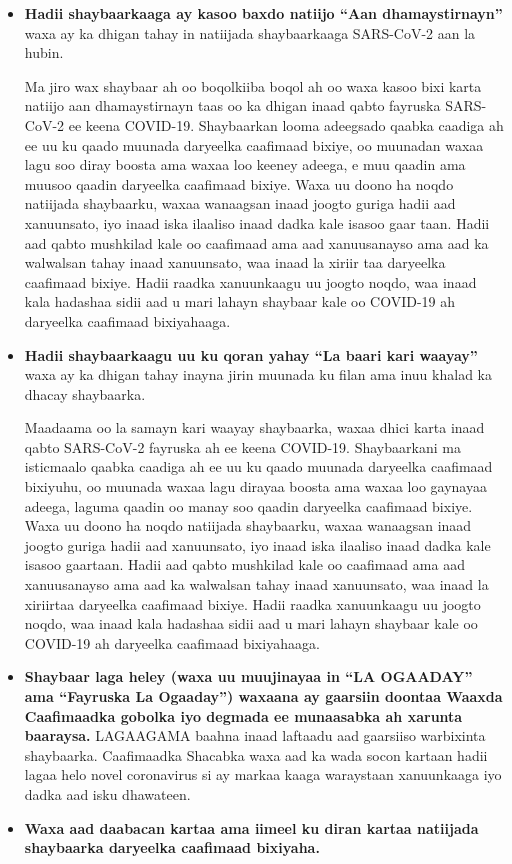 \documentclass[10pt]{article}
\begin{document}
\begin{itemize}
\item

  \textbf{Hadii shaybaarkaaga ay kasoo baxdo natiijo ``Aan dhamaystirnayn''}
  waxa ay ka dhigan tahay in natiijada shaybaarkaaga SARS-CoV-2 aan la hubin.

  Ma jiro wax shaybaar ah oo boqolkiiba boqol ah oo waxa kasoo bixi karta
  natiijo aan dhamaystirnayn taas oo ka dhigan inaad qabto fayruska SARS-CoV-2
  ee keena COVID-19.  Shaybaarkan looma adeegsado qaabka caadiga ah ee uu ku
  qaado muunada daryeelka caafimaad bixiye, oo muunadan waxaa lagu soo diray
  boosta ama waxaa loo keeney adeega, e muu qaadin ama muusoo qaadin daryeelka
  caafimaad bixiye.  Waxa uu doono ha noqdo natiijada shaybaarku, waxaa
  wanaagsan inaad joogto guriga hadii aad xanuunsato, iyo inaad iska ilaaliso
  inaad dadka kale isasoo gaar taan. Hadii aad qabto mushkilad kale oo caafimaad
  ama aad xanuusanayso ama aad ka walwalsan tahay inaad xanuunsato, waa inaad la
  xiriir taa daryeelka caafimaad bixiye.  Hadii raadka xanuunkaagu uu joogto
  noqdo, waa inaad kala hadashaa sidii aad u mari lahayn shaybaar kale oo
  COVID-19 ah daryeelka caafimaad bixiyahaaga.

\item

  \textbf{Hadii shaybaarkaagu uu ku qoran yahay ``La baari kari waayay''} waxa
  ay ka dhigan tahay inayna jirin muunada ku filan ama inuu khalad ka dhacay
  shaybaarka.

  Maadaama oo la samayn kari waayay shaybaarka, waxaa dhici karta inaad qabto
  SARS-CoV-2 fayruska ah ee keena COVID-19.  Shaybaarkani ma isticmaalo qaabka
  caadiga ah ee uu ku qaado muunada daryeelka caafimaad bixiyuhu, oo muunada
  waxaa lagu dirayaa boosta ama waxaa loo gaynayaa adeega, laguma qaadin oo
  manay soo qaadin daryeelka caafimaad bixiye. Waxa uu doono ha noqdo natiijada
  shaybaarku, waxaa wanaagsan inaad joogto guriga hadii aad xanuunsato, iyo
  inaad iska ilaaliso inaad dadka kale isasoo gaartaan. Hadii aad qabto
  mushkilad kale oo caafimaad ama aad xanuusanayso ama aad ka walwalsan tahay
  inaad xanuunsato, waa inaad la xiriirtaa daryeelka caafimaad bixiye.  Hadii
  raadka xanuunkaagu uu joogto noqdo, waa inaad kala hadashaa sidii aad u mari
  lahayn shaybaar kale oo COVID-19 ah daryeelka caafimaad bixiyahaaga.

\item

  \textbf{Shaybaar laga heley (waxa uu muujinayaa in ``LA OGAADAY'' ama
  ``Fayruska La Ogaaday'') waxaana ay gaarsiin doontaa Waaxda Caafimaadka
  gobolka iyo degmada ee munaasabka ah xarunta baaraysa.} LAGAAGAMA baahna inaad
  laftaadu aad gaarsiiso warbixinta shaybaarka. Caafimaadka Shacabka waxa aad ka
  wada socon kartaan hadii lagaa helo novel coronavirus si ay markaa kaaga
  waraystaan xanuunkaaga iyo dadka aad isku dhawateen.

\item

  \textbf{Waxa aad daabacan kartaa ama iimeel ku diran kartaa natiijada
  shaybaarka daryeelka caafimaad bixiyaha.}

\end{itemize}
\end{document}
